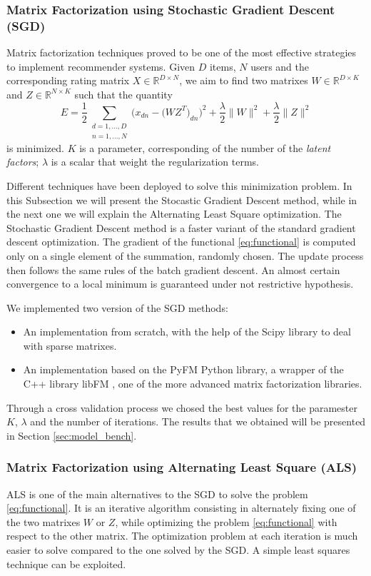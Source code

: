 \documentclass[10pt,conference,compsocconf]{IEEEtran}
\begin{document}
\subsubsection{Matrix Factorization using Stochastic Gradient Descent (SGD)}
Matrix factorization techniques proved to be one of the most effective strategies to implement 
recommender systems. Given $D$ items, $N$ users and the corresponding rating matrix 
$X \in \mathbb{R}^{D \times N}$, we aim to find two matrixes $W \in \mathbb{R}^{D \times K}$ and $Z
\in \mathbb{R}^{N \times K}$ such that the quantity 
\begin{equation}
\label{eq:functional}
E = \frac{1}{2} \sum_{\substack{d=1,...,D \\n=1,...,N}} 
\bigg( x_{dn} - \big( WZ^T \big)_{dn} \bigg) ^2 +\frac{\lambda}{2}\|W\|^2 + 
\frac{\lambda}{2}\|Z\|^2
\end{equation} 
is minimized. $K$ is a parameter,
corresponding of the number of the \textit{latent factors}; $\lambda$ is a scalar 
that weight the regularization terms.

Different techniques have been deployed to solve this minimization problem. In this Subsection we
will present the Stocastic Gradient Descent method, while in the next one we will explain the
Alternating Least Square optimization. 
The Stochastic Gradient Descent method is a faster variant of the standard gradient descent
optimization. The gradient of the functional \ref{eq:functional} is computed only on a single
element of the summation, randomly chosen. The update process then follows the same rules of the batch
gradient descent.
An almost certain convergence to a local minimum is guaranteed under not restrictive hypothesis.

We implemented two version of the SGD methods:
\begin{itemize}
\item An implementation from scratch, with the help of the Scipy library to deal with sparse
matrixes.
\item An implementation based on the PyFM Python library, a wrapper of the C++ library libFM
\cite{rendle:tist2012}, one of
the more advanced matrix factorization libraries.
\end{itemize}
Through a cross validation process we chosed the best values for the paramester $K$, $\lambda$ and
the number of iterations. The results that we obtained will be presented in Section
\ref{sec:model_bench}.

\subsubsection{Matrix Factorization using Alternating Least Square (ALS)}
ALS is one of the main alternatives to the SGD to solve the problem \ref{eq:functional}.
It is an iterative algorithm consisting in alternately fixing one of the two matrixes $W$ or $Z$,
while optimizing the problem \ref{eq:functional} with respect to the other matrix.
The optimization problem at each iteration is much easier to solve compared to the one solved by the
SGD. A simple least squares technique can be exploited.
\end{document}
